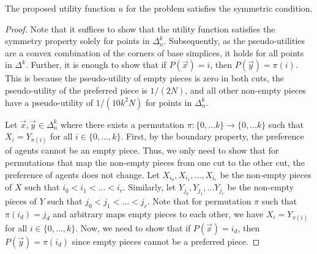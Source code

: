 \begin{lemma}\label{lem:satisfying-the-first-property}
The proposed utility function $u$ for the \mccs{} problem satisfies the symmetric condition.
\end{lemma}
\begin{proof}
Note that it suffices to show that the utility function satisfies the symmetry property solely for points in $\Delta^k_n$. Subsequently, as the pseudo-utilities are a convex combination of the corners of base simplices, it holds for all points in $\Delta^k$. Further, it is enough to show that if $P(\vec{x}) = i$, then $P(\vec{y}) = \pi(i)$. This is because the pseudo-utility of empty pieces is zero in both cuts, the pseudo-utility of the preferred piece is $1/(2N)$, and all other non-empty pieces have a pseudo-utility of $1/(10k^2 N)$ for points in $\Delta^k_n$.


Let $\vec{x}, \vec{y} \in \Delta^k_n$ where there exists a permutation $\pi: \{0, \ldots k\} \rightarrow \{0, \ldots k\}$ such that $X_i = Y_{\pi(i)}$ for all $i \in \{0, \ldots, k\}$. First, by the boundary property, the preference of agents cannot be an empty piece. Thus, we only need to show that for permutations that map the non-empty pieces from one cut to the other cut, the preference of agents does not change. Let $X_{i_0}, X_{i_1}, \ldots, X_{i_r}$ be the non-empty pieces of $X$ such that $i_0 < i_1 < \ldots < i_r$. Similarly, let $Y_{j_0}, Y_{j_1}, \ldots Y_{j_r}$ be the non-empty pieces of $Y$ such that $j_0 < j_1 < \ldots < j_r$. Note that for permutation $\pi$ such that $\pi(i_d) = j_d$ and arbitrary maps empty pieces to each other, we have $X_i = Y_{\pi(i)}$ for all $i \in \{0, \ldots, k\}$. Now, we need to show that if $P(\vec{x}) = i_d$, then $P(\vec{y}) = \pi(i_d)$ since empty pieces cannot be a preferred piece.



\end{proof}
